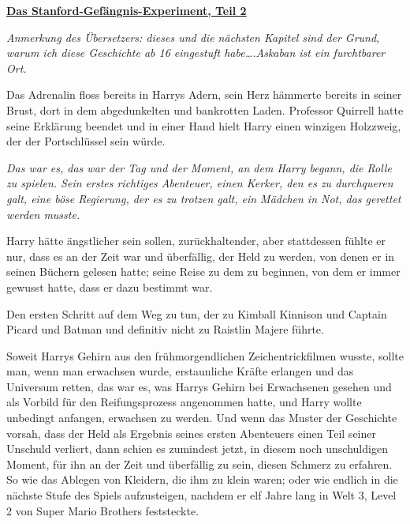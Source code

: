 

\hypertarget{das-stanford-gefuxe4ngnis-experiment-teil-2}{%

\textbf{\uline{Das Stanford-Gefängnis-Experiment, Teil 2}}

\emph{Anmerkung des Übersetzers: dieses und die nächsten Kapitel sind der Grund, warum ich diese Geschichte ab 16 eingestuft habe….Askaban ist ein furchtbarer Ort.}

Das Adrenalin floss bereits in Harrys Adern, sein Herz hämmerte bereits in seiner Brust, dort in dem abgedunkelten und bankrotten Laden. Professor Quirrell hatte seine Erklärung beendet und in einer Hand hielt Harry einen winzigen Holzzweig, der der Portschlüssel sein würde.

\emph{Das war es, das war der Tag und der Moment, an dem Harry begann, die Rolle zu spielen. Sein erstes richtiges Abenteuer, einen Kerker, den es zu durchqueren galt, eine böse Regierung, der es zu trotzen galt, ein Mädchen in Not, das gerettet werden musste.}

Harry hätte ängstlicher sein sollen, zurückhaltender, aber stattdessen fühlte er nur, dass es an der Zeit war und überfällig, der Held zu werden, von denen er in seinen Büchern gelesen hatte; seine Reise zu dem zu beginnen, von dem er immer gewusst hatte, dass er dazu bestimmt war.

Den ersten Schritt auf dem Weg zu tun, der zu Kimball Kinnison und Captain Picard und Batman und definitiv nicht zu Raistlin Majere führte.

Soweit Harrys Gehirn aus den frühmorgendlichen Zeichentrickfilmen wusste, sollte man, wenn man erwachsen wurde, erstaunliche Kräfte erlangen und das Universum retten, das war es, was Harrys Gehirn bei Erwachsenen gesehen und als Vorbild für den Reifungsprozess angenommen hatte, und Harry wollte unbedingt anfangen, erwachsen zu werden. Und wenn das Muster der Geschichte vorsah, dass der Held als Ergebnis seines ersten Abenteuers einen Teil seiner Unschuld verliert, dann schien es zumindest jetzt, in diesem noch unschuldigen Moment, für ihn an der Zeit und überfällig zu sein, diesen Schmerz zu erfahren. So wie das Ablegen von Kleidern, die ihm zu klein waren; oder wie endlich in die nächste Stufe des Spiels aufzusteigen, nachdem er elf Jahre lang in Welt 3, Level 2 von Super Mario Brothers feststeckte.

}
